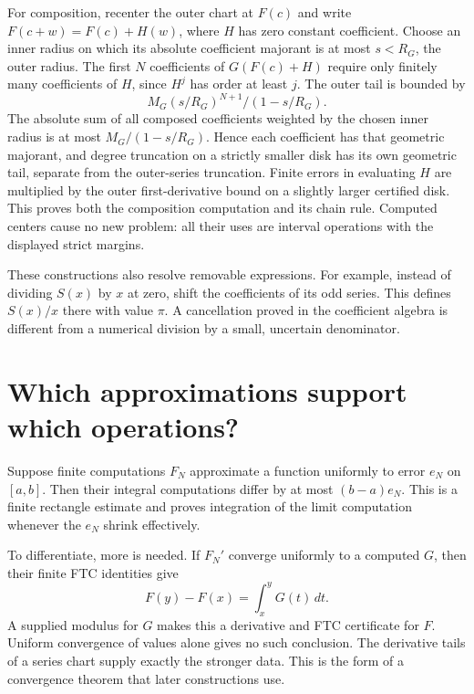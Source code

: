 For composition, recenter the outer chart at $F(c)$ and write
$F(c+w)=F(c)+H(w)$, where $H$ has zero constant coefficient.  Choose an
inner radius on which its absolute coefficient majorant is at most
$s<R_G$, the outer radius.  The first $N$ coefficients of
$G(F(c)+H)$ require only finitely many coefficients of $H$, since
$H^j$ has order at least $j$.  The outer tail is bounded by
\[
 M_G(s/R_G)^{N+1}/(1-s/R_G).
\]
The absolute sum of all composed coefficients weighted by the chosen inner
radius is at most $M_G/(1-s/R_G)$.  Hence each coefficient has that
geometric majorant, and degree truncation on a strictly smaller disk has
its own geometric tail, separate from the outer-series truncation.
Finite errors in evaluating $H$ are multiplied by the outer first-derivative
bound on a slightly larger certified disk.  This proves both the
composition computation and its chain rule.  Computed centers cause no
new problem: all their uses are interval operations with the displayed
strict margins.

These constructions also resolve removable expressions.  For example,
instead of dividing $S(x)$ by $x$ at zero, shift the coefficients of its
odd series.  This defines $S(x)/x$ there with value $\pi$.  A cancellation
proved in the coefficient algebra is different from a numerical division
by a small, uncertain denominator.

\section{Which approximations support which operations?}
Suppose finite computations $F_N$ approximate a function uniformly to
error $e_N$ on $[a,b]$.  Then their integral computations differ by at most
$(b-a)e_N$.  This is a finite rectangle estimate and proves integration
of the limit computation whenever the $e_N$ shrink effectively.

To differentiate, more is needed.  If $F_N'$ converge uniformly to a
computed $G$, then their finite FTC identities give
\[
 F(y)-F(x)=\int_x^yG(t)\,dt.
\]
A supplied modulus for $G$ makes this a derivative and FTC certificate
for $F$.  Uniform convergence of values alone gives no such conclusion.
The derivative tails of a series chart supply exactly the stronger data.
This is the form of a convergence theorem that later constructions use.


